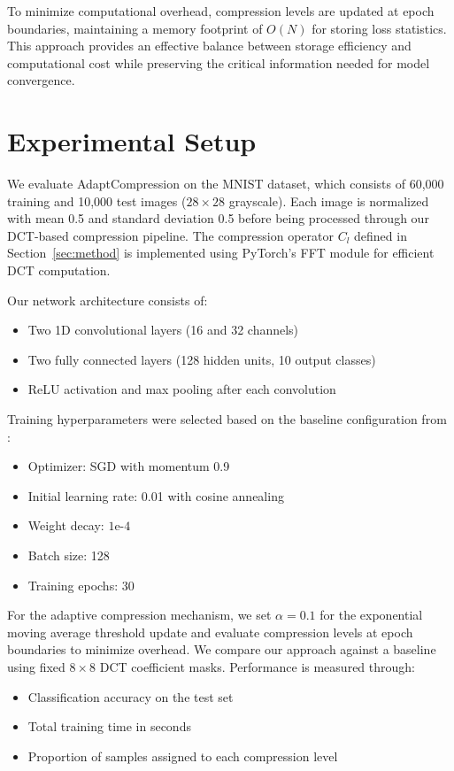 \documentclass{article} %
\begin{document}
To minimize computational overhead, compression levels are updated at epoch boundaries, maintaining a memory footprint of $O(N)$ for storing loss statistics. This approach provides an effective balance between storage efficiency and computational cost while preserving the critical information needed for model convergence.

\section{Experimental Setup}
\label{sec:experimental}

We evaluate AdaptCompression on the MNIST dataset, which consists of 60,000 training and 10,000 test images ($28 \times 28$ grayscale). Each image is normalized with mean 0.5 and standard deviation 0.5 before being processed through our DCT-based compression pipeline. The compression operator $C_l$ defined in Section~\ref{sec:method} is implemented using PyTorch's FFT module for efficient DCT computation.

Our network architecture consists of:
\begin{itemize}
    \item Two 1D convolutional layers (16 and 32 channels)
    \item Two fully connected layers (128 hidden units, 10 output classes)
    \item ReLU activation and max pooling after each convolution
\end{itemize}

Training hyperparameters were selected based on the baseline configuration from \citet{wang2022learning}:
\begin{itemize}
    \item Optimizer: SGD with momentum 0.9
    \item Initial learning rate: 0.01 with cosine annealing
    \item Weight decay: $1\text{e-}4$
    \item Batch size: 128
    \item Training epochs: 30
\end{itemize}

For the adaptive compression mechanism, we set $\alpha=0.1$ for the exponential moving average threshold update and evaluate compression levels at epoch boundaries to minimize overhead. We compare our approach against a baseline using fixed $8 \times 8$ DCT coefficient masks. Performance is measured through:
\begin{itemize}
    \item Classification accuracy on the test set
    \item Total training time in seconds
    \item Proportion of samples assigned to each compression level
\end{itemize}
\end{document}

